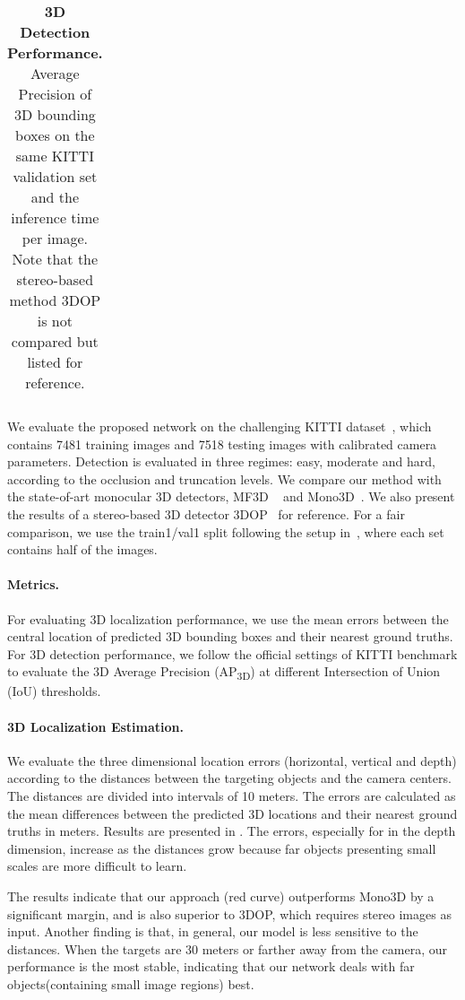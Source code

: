 \begin{table*}[t]
{\begin{spacing}{1.5}
{\begin{tabular}{|p{2cm}<{\centering}|p{1cm}<{\centering}|c||ccc||ccc||ccc|}
				\end{tabular}  
			} 
	\end{spacing}}
	\caption{\textbf{3D Detection Performance.} Average Precision of 3D bounding boxes on the same KITTI validation set and the inference time per image. Note that the stereo-based method 3DOP is not compared but listed for reference.
	}
	\label{tab:3dap} 
\end{table*}
We evaluate the proposed network on the challenging KITTI dataset~\cite{geiger2012kitti}, which contains 7481 training images and 7518 testing images with calibrated camera parameters. Detection is evaluated in three regimes: easy, moderate and hard, according to the occlusion and truncation levels. 
We compare our method with the state-of-art monocular 3D detectors, MF3D ~\cite{xu2018multifusion} and Mono3D~\cite{chen2016monocular}. We also present the results of a stereo-based 3D detector 3DOP~\cite{chen20153dop} for reference. For a fair comparison, we use the train1/val1 split following the setup in~\cite{chen2016monocular,chen2017multiview}, where each set contains half of the images.


\paragraph{Metrics.} 
For evaluating 3D localization performance, we use the mean errors between the central location of predicted 3D bounding boxes and their nearest ground truths.
For 3D detection performance, we follow the official settings of KITTI benchmark to evaluate the 3D Average Precision (AP\textsubscript{3D}) at different Intersection of Union (IoU) thresholds.  

\paragraph{3D Localization Estimation.}
We evaluate the three dimensional location errors (horizontal, vertical and depth) according to the distances between the targeting objects and the camera centers. The distances are divided into intervals of 10 meters. The errors are calculated as the mean differences between the predicted 3D locations and their nearest ground truths in meters. Results are presented in \fig{\ref{fig:localization3d}}. The errors, especially for in the depth dimension, increase as the distances grow because far objects presenting small scales are more difficult to learn.

The results indicate that our approach (red curve) outperforms Mono3D by a significant margin, and is also superior to 3DOP, which requires stereo images as input. Another finding is that, in general, our model is less sensitive to the distances. When the targets are 30 meters or farther away from the camera, our performance is the most stable, indicating that our network deals with far objects(containing small image regions) best.


